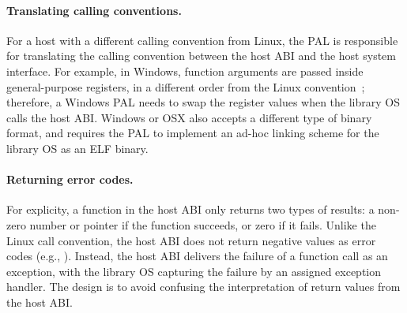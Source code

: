 








\paragraph{Translating calling conventions.}
For a host with a different calling convention from Linux,
the PAL is responsible for translating the calling convention between the host ABI and the host system interface.
For example,
in Windows, function arguments are passed inside general-purpose registers, in a different order from the Linux convention~\cite{win-abi};
therefore, a Windows PAL needs
to swap the register values when the library OS calls the host ABI.
Windows or OSX also accepts a different type of binary format,
and requires the PAL to implement an ad-hoc linking scheme for the library OS as an ELF binary.




\paragraph{Returning error codes.}
For explicity, a function in the host ABI only returns two types of results:
a non-zero number or pointer if the function succeeds, or zero if it fails.
Unlike the Linux call convention, the host ABI does not return negative values as error codes (e.g., ).
Instead, the host ABI delivers the failure of a function call
as an exception, with the library OS capturing the failure by an assigned exception handler.
The design is to avoid confusing
the interpretation of return values from the host ABI.



